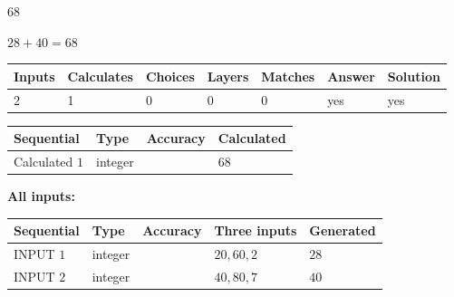 \documentclass[12pt]{article}
\begin{document}
 

68
 
 
\noindent{}
 
 

 
 
 
\noindent{}
 
 

$ %
28 +  %
40=   %
68$
 
 
\noindent{}
 
 

 
   
   
   
   
\noindent\begin{tabular}{|l|l|l|l|l|l|l|}
 \hline
Inputs & Calculates & Choices & Layers & Matches & Answer & Solution \\ \hline
 2  & 
 1  & 
 0
  & 
 0  & 
 0  & 
  yes & 
  yes 
  \\ \hline
 \end{tabular}
   
   
   
   
\noindent{}
   
   
  
  
\noindent\begin{tabular}{|l|l|l|l|}
\hline
 Sequential & Type & Accuracy & Calculated \\ 
\hline
 
 
  Calculated $  1 $ & integer &  & 
  $ 68 $ 
 \\  \hline  
 \end{tabular}
   
   
   
   
\noindent\vspace{0.1in}\hspace{-0.08in} {\textbf{\Large{All inputs: }}}
   
   
  
  
\noindent\begin{tabular}{|l|l|l|l|l|}
\hline
 Sequential & Type & Accuracy & Three inputs & Generated \\ 
\hline
 
 
  INPUT $  1 $ & integer &  & $
 20
 , 
 60
 , 
 2
 $ & $ 28 $ 
 \\  \hline  
 
 
  INPUT $  2 $ & integer &  & $
 40
 , 
 80
 , 
 7
 $ & $ 40 $ 
 \\  \hline  
 \end{tabular}
   
\end{document}
